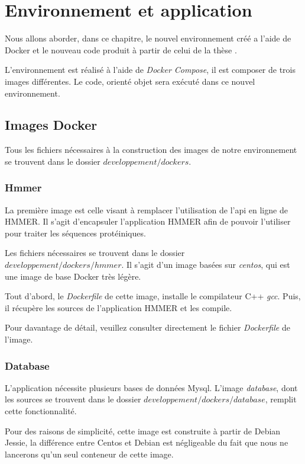 \chapter{Environnement et application}
\label{ch:app}

Nous allons aborder, dans ce chapitre, le nouvel environnement créé a l'aide de Docker et le nouveau code produit à partir de celui de la thèse \thLeite.

L'environnement est réalisé à l'aide de \emph{Docker Compose}, il est composer de trois images différentes. Le code, orienté objet sera exécuté dans ce nouvel environnement.

\section{Images Docker}
Tous les fichiers nécessaires à la construction des images de notre environnement se trouvent dans le dossier \emph{$developpement/dockers$}.

\subsection{Hmmer}
La première image est celle visant à remplacer l'utilisation de l'\gls{api} en ligne de HMMER. Il s’agit d'encapsuler l'application HMMER afin de pouvoir l'utiliser pour traiter les séquences protéiniques.

Les fichiers nécessaires se trouvent dans le dossier \emph{$developpement/dockers/hmmer$}. Il s’agit d'un image basées sur \emph{centos}, qui est une image de base Docker très légère.

Tout d'abord, le \emph{Dockerfile} de cette image, installe le compilateur C++ \emph{gcc}. Puis, il récupère les sources de l'application HMMER et les compile.

Pour davantage de détail, veuillez consulter directement le fichier \emph{Dockerfile} de l'image.

\subsection{Database}
L'application nécessite plusieurs bases de données Mysql. L'image \emph{database}, dont les sources se trouvent dans le dossier \emph{$developpement/dockers/database$}, remplit cette fonctionnalité.

Pour des raisons de simplicité, cette image est construite à partir de Debian Jessie, la différence entre Centos et Debian est négligeable du fait que nous ne lancerons qu'un seul conteneur de cette image.

